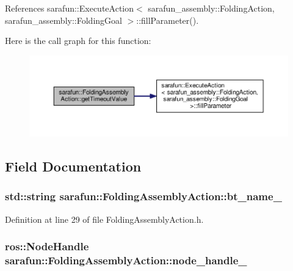 References sarafun\-::\-Execute\-Action$<$ sarafun\-\_\-assembly\-::\-Folding\-Action, sarafun\-\_\-assembly\-::\-Folding\-Goal $>$\-::fill\-Parameter().



Here is the call graph for this function\-:\nopagebreak
\begin{figure}[H]
\begin{center}
\leavevmode
\includegraphics[width=350pt]{dd/df2/classsarafun_1_1FoldingAssemblyAction_a14174e375aa1b8d5b63159f275b7d971_a14174e375aa1b8d5b63159f275b7d971_cgraph}
\end{center}
\end{figure}




\subsection{Field Documentation}
\hypertarget{classsarafun_1_1FoldingAssemblyAction_a058ad644052e931e604053b6064f7576_a058ad644052e931e604053b6064f7576}{
\subsubsection[{bt\-\_\-name\-\_\-}]{\setlength{\rightskip}{0pt plus 5cm}std\-::string sarafun\-::\-Folding\-Assembly\-Action\-::bt\-\_\-name\-\_\-\hspace{0.3cm}{\ttfamily [private]}}}\label{classsarafun_1_1FoldingAssemblyAction_a058ad644052e931e604053b6064f7576_a058ad644052e931e604053b6064f7576}


Definition at line 29 of file Folding\-Assembly\-Action.\-h.

\hypertarget{classsarafun_1_1FoldingAssemblyAction_a93ef41f7c8fe0fff59227e01deae7625_a93ef41f7c8fe0fff59227e01deae7625}{
\subsubsection[{node\-\_\-handle\-\_\-}]{\setlength{\rightskip}{0pt plus 5cm}ros\-::\-Node\-Handle sarafun\-::\-Folding\-Assembly\-Action\-::node\-\_\-handle\-\_\-\hspace{0.3cm}{\ttfamily [private]}}}\label{classsarafun_1_1FoldingAssemblyAction_a93ef41f7c8fe0fff59227e01deae7625_a93ef41f7c8fe0fff59227e01deae7625}


